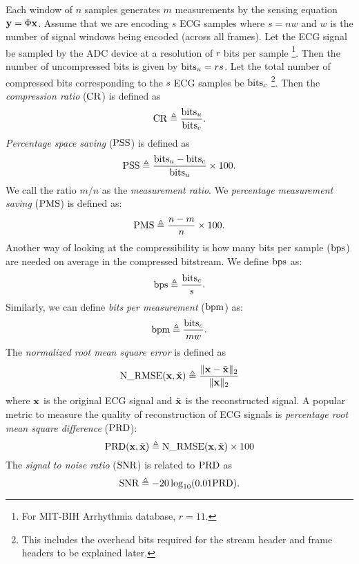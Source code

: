 Each window of $n$
samples generates $m$ measurements by the
sensing equation $\mathbf{y} = \Phi \mathbf{x}$.
Assume that we are encoding $s$ ECG samples where
$s = n w$ and $w$ is the number of signal windows
being encoded (across all frames).
Let the ECG signal be sampled by the ADC device
at a resolution of $r$ bits per sample
\footnote{For MIT-BIH Arrhythmia database, $r=11$.}.
Then the number of uncompressed bits is given by
$\mathrm{bits}_u = r s$.
Let the total number of compressed
bits corresponding to the $s$ ECG samples be
$\mathrm{bits}_c$ \footnote{This includes the overhead bits required
for the stream header and frame headers to be explained later.}.
Then the \emph{compression ratio} ($\mathrm{CR}$) is defined as
\begin{equation}
\mathrm{CR} \triangleq \frac{\mathrm{bits}_u}{\mathrm{bits}_c}.
\end{equation}
\emph{Percentage space saving} ($\mathrm{PSS}$) is defined as
\begin{equation}
\mathrm{PSS} \triangleq \frac{\mathrm{bits}_u - \mathrm{bits}_c}{\mathrm{bits}_u} \times 100.
\end{equation}
We call the ratio $m/n$ as the \emph{measurement ratio}.
We \emph{percentage measurement saving} ($\mathrm{PMS}$) is defined as:
\begin{equation}
\mathrm{PMS} \triangleq \frac{n - m}{n} \times 100.
\end{equation}
Another way of looking at the compressibility is how
many bits per sample ($\mathrm{bps}$) are needed on average in the compressed
bitstream. We define $\mathrm{bps}$ as:
\begin{equation}
\mathrm{bps} \triangleq \frac{\mathrm{bits}_c}{s}.
\end{equation}
Similarly, we can define \emph{bits per measurement} ($\mathrm{bpm}$) as:
\begin{equation}
\mathrm{bpm} \triangleq \frac{\mathrm{bits}_c}{m w}.
\end{equation}
The \emph{normalized root mean square error} is defined as
\begin{equation}
\mathrm{N\_RMSE} (\mathbf{x}, \tilde{\mathbf{x}}) \triangleq \frac{\| \mathbf{x} - \tilde{\mathbf{x}}\|_2}{\| \mathbf{x} \|_2}
\end{equation}
where $\mathbf{x}$ is the original ECG signal and $\tilde{\mathbf{x}}$
is the reconstructed signal.
A popular metric to measure the quality of reconstruction
of ECG signals is
\emph{percentage root mean square difference} ($\mathrm{PRD}$):
\begin{equation}
\mathrm{PRD}(\mathbf{x}, \tilde{\mathbf{x}}) \triangleq \mathrm{N\_RMSE}(\mathbf{x}, \tilde{\mathbf{x}}) \times 100
\end{equation}
The \emph{signal to noise ratio} ($\mathrm{SNR}$) is related to $\mathrm{PRD}$ as
\begin{equation}
\mathrm{SNR} \triangleq -20 \log_{10}(0.01 \mathrm{PRD}).
\end{equation}
